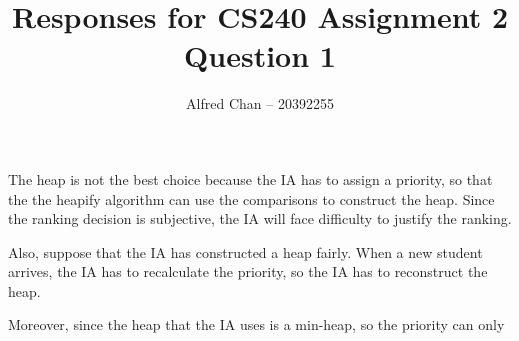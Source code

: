 \documentclass[12pt]{article}
\title{Responses for CS240 Assignment 2 Question 1}
\author{Alfred Chan -- 20392255}
\begin{document}
\lstset{
	language=bash,
	numbers=left,
	showspaces=false,
	showstringspaces=false,
	stepnumber=1,
	basicstyle=\ttfamily,
	frame=single,
	breaklines=true,
	tabsize=2
}

The heap is not the best choice because the IA has to assign a priority, so that the the heapify algorithm can use the comparisons to construct the heap.
Since the ranking decision is subjective, the IA will face difficulty to justify the ranking.

Also, suppose that the IA has constructed a heap fairly. 
When a new student arrives, the IA has to recalculate the priority, so the IA has to reconstruct the heap.

Moreover, since the heap that the IA uses is a min-heap, so the priority can only
\end{document}
